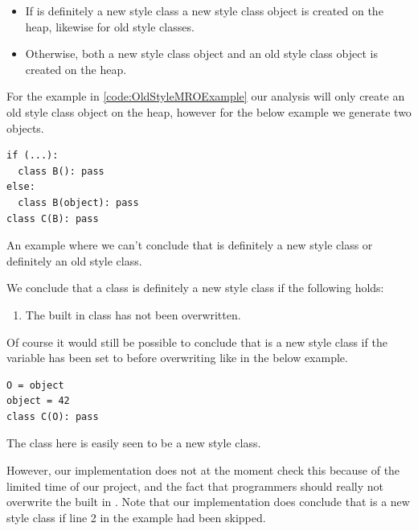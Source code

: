\begin{itemize}
	\item If  is definitely a new style class a new style class object is created on the heap, likewise for old style classes.
	\item Otherwise, both a new style class object and an old style class object is created on the heap.
\end{itemize}

For the example in \autoref{code:OldStyleMROExample} our analysis will only create an old style class object on the heap, however for the below example we generate two objects.

\begin{listing}[H]
	\begin{verbatim}
if (...):
  class B(): pass
else:
  class B(object): pass
class C(B): pass
	\end{verbatim}
	\caption{An example where we can't conclude that  is definitely a new style class or definitely an old style class.}\label{code:NotDefinatelyNewOldStyleClass}
\end{listing}

We conclude that a class is definitely a new style class if the following holds:

\begin{enumerate}
	\item The built in class  has not been overwritten.
\end{enumerate}

Of course it would still be possible to conclude that  is a new style class if the variable  has been set to  before overwriting  like in the below example.

\begin{listing}[H]
	\begin{verbatim}
O = object
object = 42
class C(O): pass
	\end{verbatim}
	\caption{The class  here is easily seen to be a new style class.}\label{code:ClassOverwrittenObject}
\end{listing}

However, our implementation does not at the moment check this because of the limited time of our project, and the fact that programmers should really not overwrite the built in . Note that our implementation does conclude that  is a new style class if line 2 in the example had been skipped.


